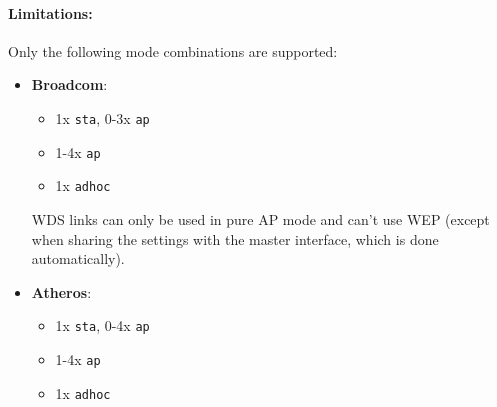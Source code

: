 \paragraph{Limitations:}

Only the following mode combinations are supported:

\begin{itemize}
    \item \textbf{Broadcom}: \\
        \begin{itemize}
            \item 1x \texttt{sta}, 0-3x \texttt{ap}
            \item 1-4x \texttt{ap}
            \item 1x \texttt{adhoc}
        \end{itemize}

        WDS links can only be used in pure AP mode and can't use WEP (except when sharing the
        settings with the master interface, which is done automatically).

    \item \textbf{Atheros}: \\
        \begin{itemize}
            \item 1x \texttt{sta}, 0-4x \texttt{ap}
            \item 1-4x \texttt{ap}
            \item 1x \texttt{adhoc}
        \end{itemize}

\end{itemize}


